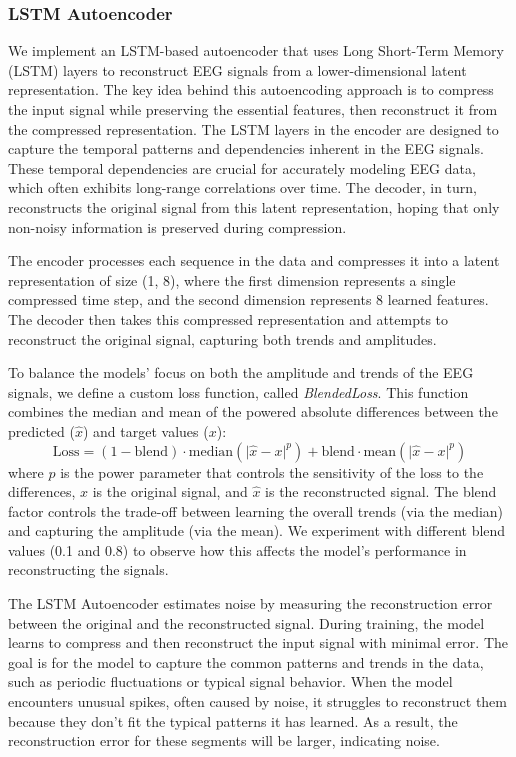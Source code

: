 \subsubsection{LSTM Autoencoder}

We implement an LSTM-based autoencoder that uses Long Short-Term Memory (LSTM) layers to reconstruct EEG signals from a lower-dimensional latent representation. The key idea behind this autoencoding approach is to compress the input signal while preserving the essential features, then reconstruct it from the compressed representation. The LSTM layers in the encoder are designed to capture the temporal patterns and dependencies inherent in the EEG signals. These temporal dependencies are crucial for accurately modeling EEG data, which often exhibits long-range correlations over time. The decoder, in turn, reconstructs the original signal from this latent representation, hoping that only non-noisy information is preserved during compression.

The encoder processes each sequence in the data and compresses it into a latent representation of size (1, 8), where the first dimension represents a single compressed time step, and the second dimension represents 8 learned features. The decoder then takes this compressed representation and attempts to reconstruct the original signal, capturing both trends and amplitudes.

To balance the models' focus on both the amplitude and trends of the EEG signals, we define a custom loss function, called \emph{BlendedLoss}. This function combines the median and mean of the powered absolute differences between the predicted ($\hat{x}$) and target values ($x$):
%
\begin{equation}
\text{Loss} = (1 - \text{blend}) \cdot \text{median}(\lvert \hat{x} - x \rvert^p) + \text{blend} \cdot \text{mean}(\lvert \hat{x} - x \rvert^p)
\label{eq:blended_loss}
\end{equation}
%
where $p$ is the power parameter that controls the sensitivity of the loss to the differences, $x$ is the original signal, and $\hat{x}$ is the reconstructed signal. The blend factor controls the trade-off between learning the overall trends (via the median) and capturing the amplitude (via the mean). We experiment with different blend values (0.1 and 0.8) to observe how this affects the model’s performance in reconstructing the signals.

The LSTM Autoencoder estimates noise by measuring the reconstruction error between the original and the reconstructed signal. During training, the model learns to compress and then reconstruct the input signal with minimal error. The goal is for the model to capture the common patterns and trends in the data, such as periodic fluctuations or typical signal behavior. When the model encounters unusual spikes, often caused by noise, it struggles to reconstruct them because they don't fit the typical patterns it has learned. As a result, the reconstruction error for these segments will be larger, indicating noise.

